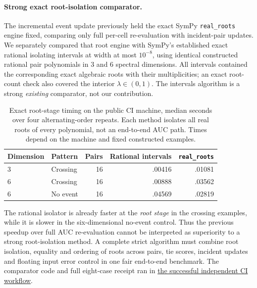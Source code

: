 \paragraph{Strong exact root-isolation comparator.}
The incremental event update previously held the exact SymPy
\texttt{real\_roots} engine fixed, comparing only full per-cell
re-evaluation with incident-pair updates. We separately compared that
root engine with SymPy's established exact rational isolating
intervals at width at most $10^{-8}$, using identical constructed
rational pair polynomials in 3 and 6 spectral dimensions. All
intervals contained the corresponding exact algebraic roots with
their multiplicities; an exact root-count check also covered the
interior $\lambda\in(0,1)$. The intervals algorithm is a strong
\emph{existing} comparator, not our contribution.

\begin{table}[h!]\centering\small
\caption{Exact root-stage timing on the public CI machine, median
seconds over four alternating-order repeats. Each method isolates all
real roots of every polynomial, not an end-to-end AUC path.
Times depend on the machine and fixed constructed examples.}
\label{tab:p4-root-isolator}
\begin{tabular}{llrrr}
\toprule
Dimension & Pattern & Pairs & Rational intervals & \texttt{real\_roots}\\
\midrule
3 & Crossing & 16 & .00416 & .01081\\
6 & Crossing & 16 & .00888 & .03562\\
6 & No event & 16 & .04569 & .02819\\
\bottomrule
\end{tabular}
\end{table}

The rational isolator is already faster at the \emph{root stage} in
the crossing examples, while it is slower in the six-dimensional
no-event control. Thus the previous speedup over full AUC
re-evaluation cannot be interpreted as superiority to a strong
root-isolation method. A complete strict algorithm must combine
root isolation, equality and ordering of roots across pairs, tie
scores, incident updates and floating input error control in one
fair end-to-end benchmark. The comparator code and full eight-case
receipt ran in
\href{https://github.com/lindicaphxag-tech/kaggle/actions/runs/38363154062}{the successful independent CI workflow}.

